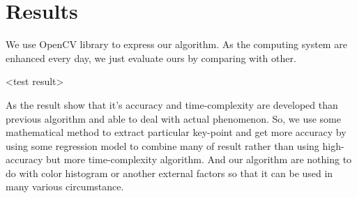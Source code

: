 \section{Results}
We use OpenCV library to express our algorithm. As the computing system are enhanced every day, we just evaluate ours by comparing with other. 

<test result>

As the result show that it's accuracy and time-complexity are developed than previous algorithm and able to deal with actual phenomenon. So, we use some mathematical method to extract particular key-point and get more accuracy by using some regression model to combine many of result rather than using high-accuracy but more time-complexity algorithm. And our algorithm are nothing to do with color histogram or another external factors so that it can be used in many various circumstance.
\label{sec:results}
